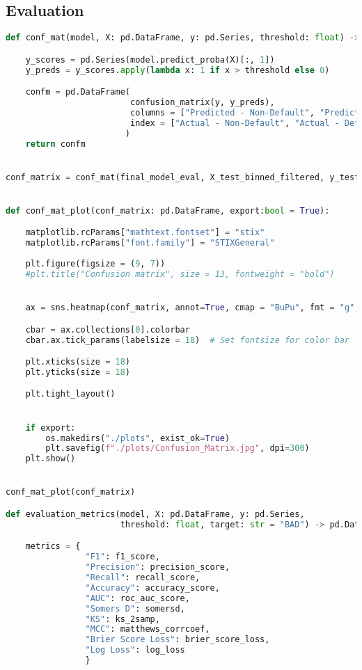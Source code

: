 \subsection{Evaluation}
\begin{lstlisting}[language=Python, basicstyle=\footnotesize\ttfamily]
def conf_mat(model, X: pd.DataFrame, y: pd.Series, threshold: float) -> pd.DataFrame:

    y_scores = pd.Series(model.predict_proba(X)[:, 1])
    y_preds = y_scores.apply(lambda x: 1 if x > threshold else 0)

    confm = pd.DataFrame(
                         confusion_matrix(y, y_preds),
                         columns = ["Predicted - Non-Default", "Predicted - Default"],
                         index = ["Actual - Non-Default", "Actual - Default"]
                        )
    return confm


conf_matrix = conf_mat(final_model_eval, X_test_binned_filtered, y_test, opt_threshold)


def conf_mat_plot(conf_matrix: pd.DataFrame, export:bool = True):

    matplotlib.rcParams["mathtext.fontset"] = "stix"
    matplotlib.rcParams["font.family"] = "STIXGeneral"
    
    plt.figure(figsize = (9, 7))
    #plt.title("Confusion matrix", size = 13, fontweight = "bold")


    ax = sns.heatmap(conf_matrix, annot=True, cmap = "BuPu", fmt = "g", annot_kws = {"size": 18})

    cbar = ax.collections[0].colorbar
    cbar.ax.tick_params(labelsize = 18)  # Set fontsize for color bar

    plt.xticks(size = 18)
    plt.yticks(size = 18)

    plt.tight_layout()


    if export:
        os.makedirs("./plots", exist_ok=True)
        plt.savefig(f"./plots/Confusion_Matrix.jpg", dpi=300)
    plt.show()


conf_mat_plot(conf_matrix)

def evaluation_metrics(model, X: pd.DataFrame, y: pd.Series,
                       threshold: float, target: str = "BAD") -> pd.DataFrame:

    metrics = {
                "F1": f1_score,
                "Precision": precision_score, 
                "Recall": recall_score, 
                "Accuracy": accuracy_score,
                "AUC": roc_auc_score,
                "Somers D": somersd,
                "KS": ks_2samp, 
                "MCC": matthews_corrcoef,
                "Brier Score Loss": brier_score_loss,
                "Log Loss": log_loss
                }



\end{lstlisting}
